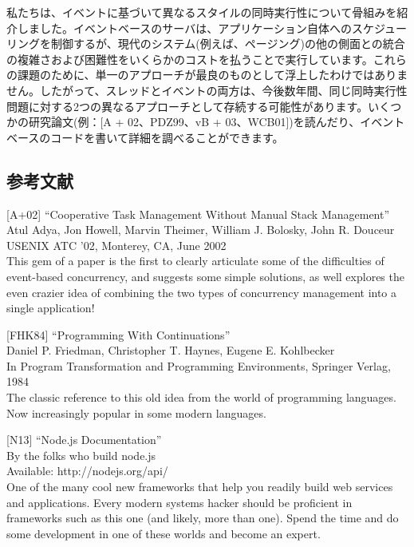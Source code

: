 私たちは、イベントに基づいて異なるスタイルの同時実行性について骨組みを紹介しました。イベントベースのサーバは、アプリケーション自体へのスケジューリングを制御するが、現代のシステム(例えば、ページング)の他の側面との統合の複雑さおよび困難性をいくらかのコストを払うことで実行しています。これらの課題のために、単一のアプローチが最良のものとして浮上したわけではありません。したがって、スレッドとイベントの両方は、今後数年間、同じ同時実行性問題に対する2つの異なるアプローチとして存続する可能性があります。いくつかの研究論文(例：{[}A
+ 02、PDZ99、vB +
03、WCB01{]})を読んだり、イベントベースのコードを書いて詳細を調べることができます。

\hypertarget{ux53c2ux8003ux6587ux732e-22}{%
\subsection*{参考文献}\label{ux53c2ux8003ux6587ux732e-22}}

{[}A+02{]} ``Cooperative Task Management Without Manual Stack
Management''\\
Atul Adya, Jon Howell, Marvin Theimer, William J. Bolosky, John R.
Douceur\\
USENIX ATC '02, Monterey, CA, June 2002\\
This gem of a paper is the first to clearly articulate some of the
difficulties of event-based concurrency, and suggests some simple
solutions, as well explores the even crazier idea of combining the two
types of concurrency management into a single application!

{[}FHK84{]} ``Programming With Continuations''\\
Daniel P. Friedman, Christopher T. Haynes, Eugene E. Kohlbecker\\
In Program Transformation and Programming Environments, Springer Verlag,
1984\\
The classic reference to this old idea from the world of programming
languages. Now increasingly popular in some modern languages.

{[}N13{]} ``Node.js Documentation''\\
By the folks who build node.js\\
Available: http://nodejs.org/api/\\
One of the many cool new frameworks that help you readily build web
services and applications. Every modern systems hacker should be
proficient in frameworks such as this one (and likely, more than one).
Spend the time and do some development in one of these worlds and become
an expert.

